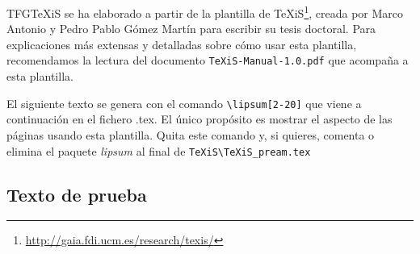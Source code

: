 TFGTeXiS se ha elaborado a partir de la plantilla de TeXiS\footnote{\url{http://gaia.fdi.ucm.es/research/texis/}}, creada por Marco Antonio y Pedro Pablo Gómez Martín para escribir su tesis doctoral. Para explicaciones más extensas y detalladas sobre cómo usar esta plantilla, recomendamos la lectura del documento \texttt{TeXiS-Manual-1.0.pdf} que acompaña a esta plantilla.

El siguiente texto se genera con el comando \verb|\lipsum[2-20]| que viene a continuación en el fichero .tex. El único propósito es mostrar el aspecto de las páginas usando esta plantilla. Quita este comando y, si quieres, comenta o elimina el paquete \textit{lipsum} al final de \verb|TeXiS\TeXiS_pream.tex|

\subsection{Texto de prueba}

